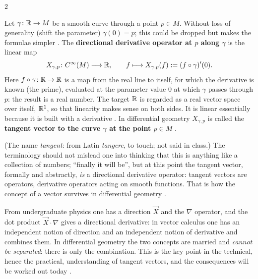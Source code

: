 \begin{paracol}{2}
\begin{definition}\label{def:tv-vector}
Let $\gamma\colon\mathbb{R}\to M$ be a smooth curve through a point $p\in M$. Without loss of generality (shift the parameter) $\gamma(0)=p$; this could be dropped but makes the formulae simpler   .
The \textbf{directional derivative operator at $p$ along $\gamma$} is the linear map
\[
  X_{\gamma,p}\colon C^\infty(M)\longrightarrow\mathbb{R},\qquad f\longmapsto X_{\gamma,p}(f):=(f\circ\gamma)'(0).
\]
Here $f\circ\gamma\colon\mathbb{R}\to\mathbb{R}$ is a map from the real line to itself, for which the derivative is known (the prime), evaluated at the parameter value $0$ at which $\gamma$ passes through $p$: the result is a real number. The target $\mathbb{R}$ is regarded as a real vector space
over itself, $\mathbb{R}^1$, so that linearity makes sense on both sides. It is linear essentially because it is built with a derivative      .
In differential geometry $X_{\gamma,p}$ is called the \textbf{tangent vector to the curve $\gamma$ at the point $p\in M$}  .
\end{definition}
(The name \emph{tangent}: from Latin \emph{tangere}, to touch; not said in class.)
The terminology should not mislead one into thinking that this is anything like a collection of numbers; ``finally it will be'', but at this point the tangent vector, formally and abstractly, \emph{is} a directional derivative operator: tangent vectors are operators, derivative operators
acting on smooth functions. That is how the concept of a vector survives in differential geometry  .

\begin{intuition}\label{int:tv-married}
From undergraduate physics one has a direction $\vec X$ and the $\nabla$ operator, and the dot product $\vec X\cdot\nabla$ gives a directional derivative: in vector calculus one has an independent notion of direction and an independent notion of derivative and combines them. In
differential geometry the two concepts are married and \emph{cannot be separated}: there is only the combination. This is the key point in the technical, hence the practical, understanding of tangent vectors, and the consequences will be worked out today    .
\end{intuition}


\end{paracol}
